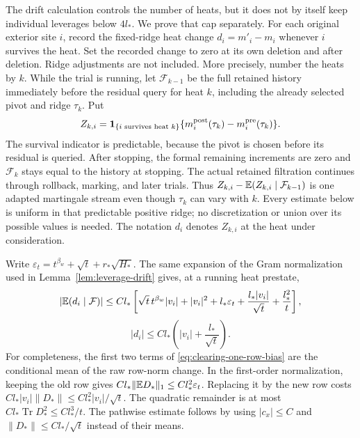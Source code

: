 The drift calculation controls the number of heats, but it does not by itself
keep individual leverages below $4l_*$.  We prove that cap separately.  For each
original exterior site $i$, record the fixed-ridge heat change
$d_i=m'_i-m_i$ whenever $i$ survives the heat.  Set the recorded change to zero
at its own deletion and after deletion.  Ridge adjustments are not included.
More precisely, number the heats by $k$. While the trial is running, let
$\mathcal F_{k-1}$ be the full retained history immediately before the
residual query for heat $k$, including the already selected pivot and ridge
$\tau_k$. Put
\[
 Z_{k,i}={\bf1}_{\{i\text{ survives heat }k\}}
       \{m_i^{\mathrm{post}}(\tau_k)-m_i^{\mathrm{pre}}(\tau_k)\}.
\]
The survival indicator is predictable, because the pivot is chosen before
its residual is queried. After stopping, the formal remaining increments
are zero and $\mathcal F_k$ stays equal to the history at stopping. The
actual retained filtration continues through rollback, marking, and later
trials.
Thus $Z_{k,i}-\mathbb E(Z_{k,i}\mid\mathcal F_{k-1})$ is one adapted martingale
stream even though $\tau_k$ can vary with $k$.  Every estimate below is uniform
in that predictable positive ridge; no discretization or union over its
possible values is needed.  The notation $d_i$ denotes $Z_{k,i}$ at the heat
under consideration.

Write $\varepsilon_t=t^{\beta_w}+\sqrt t+r_*\sqrt{H_*}$.  The same expansion
of the Gram normalization used in Lemma~\ref{lem:leverage-drift} gives, at a
running heat prestate,
\begin{equation}\label{eq:clearing-one-row-bias}
 |\mathbb E(d_i\mid\mathcal F)|
 \le Cl_*\left[
 \sqrt t\,t^{\beta_w}|v_i|+|v_i|^2
 +l_*\varepsilon_t+\frac{l_*|v_i|}{\sqrt t}
 +\frac{l_*^2}{t}\right],
\end{equation}
\begin{equation}\label{eq:clearing-one-row-jump}
 |d_i|\le Cl_*\left(|v_i|+\frac{l_*}{\sqrt t}\right).
\end{equation}
For completeness, the first two terms of
\eqref{eq:clearing-one-row-bias} are the conditional mean of the raw row-norm
change.  In the first-order normalization, keeping the old row gives
$Cl_*\|\mathbb E D_*\|_1\le Cl_*^2\varepsilon_t$.  Replacing it by
the new row costs $Cl_*|v_i|\|D_*\|\le
Cl_*^2|v_i|/\sqrt t$.  The quadratic remainder is at most
$Cl_*\operatorname{Tr}D_*^2\le Cl_*^3/t$.
The pathwise estimate follows by using $|c_x|\le C$ and
$\|D_*\|\le Cl_*/\sqrt t$ instead of their means.

